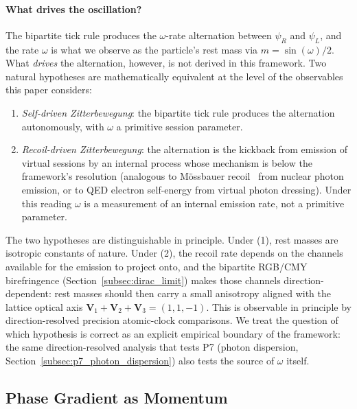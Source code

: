 \paragraph{What drives the oscillation?}
The bipartite tick rule produces the $\omega$-rate alternation between
$\psi_R$ and $\psi_L$, and the rate $\omega$ is what we observe as the
particle's rest mass via $m = \sin(\omega)/2$.  What \emph{drives} the
alternation, however, is not derived in this framework.  Two natural
hypotheses are mathematically equivalent at the level of the
observables this paper considers:
\begin{enumerate}
    \item \emph{Self-driven Zitterbewegung}: the bipartite tick rule
        produces the alternation autonomously, with $\omega$ a primitive
        session parameter.
    \item \emph{Recoil-driven Zitterbewegung}: the alternation is the
        kickback from emission of virtual sessions by an internal
        process whose mechanism is below the framework's resolution
        (analogous to M\"ossbauer recoil~\cite{mossbauer1958} from
        nuclear photon emission, or to QED electron self-energy from
        virtual photon dressing).  Under this reading $\omega$ is a
        measurement of an internal emission rate, not a primitive
        parameter.
\end{enumerate}
The two hypotheses are distinguishable in principle.  Under (1), rest
masses are isotropic constants of nature.  Under (2), the recoil rate
depends on the channels available for the emission to project onto, and
the bipartite RGB/CMY birefringence (Section~\ref{subsec:dirac_limit})
makes those channels direction-dependent: rest masses should then carry
a small anisotropy aligned with the lattice optical axis
$\mathbf{V}_1+\mathbf{V}_2+\mathbf{V}_3 = (1,1,-1)$.  This is observable
in principle by direction-resolved precision atomic-clock comparisons.
We treat the question of which hypothesis is correct as an explicit
empirical boundary of the framework: the same direction-resolved
analysis that tests P7 (photon dispersion,
Section~\ref{subsec:p7_photon_dispersion}) also tests the source of
$\omega$ itself.

\subsection{Phase Gradient as Momentum}
\label{subsec:momentum_emergence}


